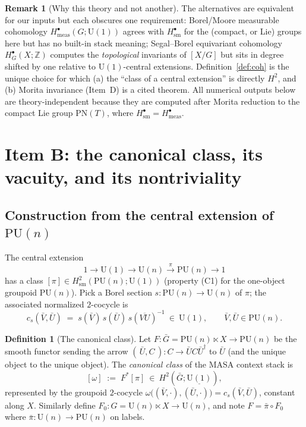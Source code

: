 \documentclass[11pt]{article}
\theoremstyle{definition}
\newtheorem{definition}[theorem]{Definition}
\newtheorem{remark}[theorem]{Remark}
\newcommand{\U}{\mathrm{U}}
\newcommand{\PU}{\mathrm{PU}}
\newcommand{\PN}{\mathrm{PN}}
\newcommand{\Z}{\mathbb{Z}}
\newcommand{\sm}{\mathrm{sm}}
\begin{document}
\begin{remark}[Why this theory and not another]
The alternatives are equivalent for our inputs but each obscures one requirement:
Borel/Moore measurable cohomology $H^{\bullet}_{\mathrm{meas}}(G;\U(1))$ agrees with
$H^{\bullet}_{\sm}$ for the (compact, or Lie) groups here \cite{MooreIII,WagnerAustin} but
has no built-in stack meaning; Segal--Borel equivariant cohomology $H^{\bullet}_{G}(X;\Z)$
computes the \emph{topological} invariants of $[X/G]$ but sits in degree shifted by one
relative to $\U(1)$-central extensions. Definition~\ref{def:coh} is the unique choice for
which (a) the ``class of a central extension'' is directly $H^2$, and (b) Morita invariance
(Item~D) is a cited theorem. All numerical outputs below are theory-independent because
they are computed after Morita reduction to the compact Lie group $\PN(T)$, where
$H^{\bullet}_{\sm}=H^{\bullet}_{\mathrm{meas}}$.
\end{remark}

\section{Item B: the canonical class, its vacuity, and its nontriviality}\label{sec:B}

\subsection{Construction from the central extension of $\PU(n)$}

The central extension
\begin{equation}\label{eq:UPU}
1\longrightarrow \U(1)\longrightarrow \U(n)\xrightarrow{\ \pi\ }\PU(n)\longrightarrow 1
\end{equation}
has a class $[\pi]\in H^2_{\sm}(\PU(n);\U(1))$ (property (C1) for the one-object groupoid
$\PU(n)$). Pick a Borel section $s\colon\PU(n)\to\U(n)$ of $\pi$; the associated normalized
$2$-cocycle is
\[
c_s(\bar V,\bar U)\;=\;s(\bar V)\,s(\bar U)\,s(\overline{VU})^{-1}\ \in\ \U(1),
\qquad \bar V,\bar U\in\PU(n).
\]

\begin{definition}[The canonical class]\label{def:canon}
Let $F\colon \bar G=\PU(n)\ltimes X\to \PU(n)$ be the smooth functor sending the arrow
$(\,\bar U, C\,)\colon C\to \bar U C\bar U^{\dagger}$ to $\bar U$ (and the unique object to
the unique object). The \emph{canonical class} of the MASA context stack is
\[
[\omega]\;:=\;F^{*}[\pi]\ \in\ H^2(\bar G;\underline{\U(1)}),
\]
represented by the groupoid $2$-cocycle
$\omega\big((\bar V,\cdot),(\bar U,\cdot)\big)=c_s(\bar V,\bar U)$, constant along $X$.
Similarly define $F_0\colon G=\U(n)\ltimes X\to\U(n)$, and note $F=\bar\pi\circ F_0$ where
$\bar\pi\colon\U(n)\to\PU(n)$ on labels.
\end{definition}
\end{document}

